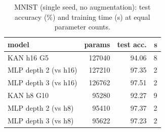 \begin{table}[!htb]
\caption{MNIST (single seed, no augmentation): test accuracy (\%) and training time (s) at equal parameter counts.}\label{tab:mnist}
\centering\footnotesize
\begin{tabular}{lrrr}
\toprule
model & params & test acc. & s \\
\midrule
KAN h16 G5 & 127040 & 94.06 & 8 \\
MLP depth 2 (vs h16) & 127210 & 97.35 & 2 \\
MLP depth 3 (vs h16) & 126762 & 97.51 & 2 \\
KAN h8 G10 & 95280 & 92.27 & 9 \\
MLP depth 2 (vs h8) & 95410 & 97.37 & 2 \\
MLP depth 3 (vs h8) & 95622 & 97.23 & 2 \\
\bottomrule
\end{tabular}
\end{table}
